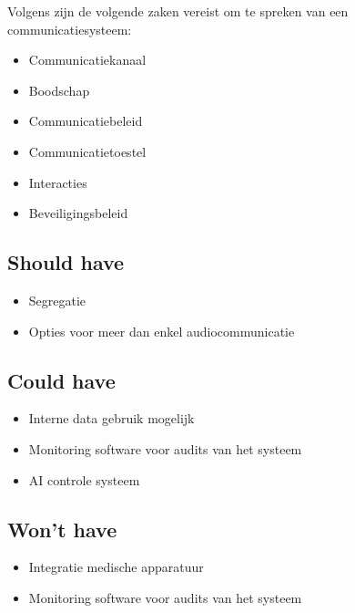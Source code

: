 Volgens \textcite{Coiera2006} zijn de volgende zaken vereist om te spreken van een communicatiesysteem:
\begin{itemize}
  \item Communicatiekanaal
  \item Boodschap
  \item Communicatiebeleid
  \item Communicatietoestel
  \item Interacties
  \item Beveiligingsbeleid
\end{itemize}

\subsection{Should have}
\label{sec:Should-have}

\begin{itemize}
  \item Segregatie
  \item Opties voor meer dan enkel audiocommunicatie
\end{itemize}

\subsection{Could have}
\label{sec:Could-have}

\begin{itemize}
  \item Interne data gebruik mogelijk
  \item Monitoring software voor audits van het systeem
  \item AI controle systeem
\end{itemize}

\subsection{Won't have}
\label{sec:Wont-have}

\begin{itemize}
  \item Integratie medische apparatuur
  \item Monitoring software voor audits van het systeem
\end{itemize}

\section{}%
\label{sec:andere}%

